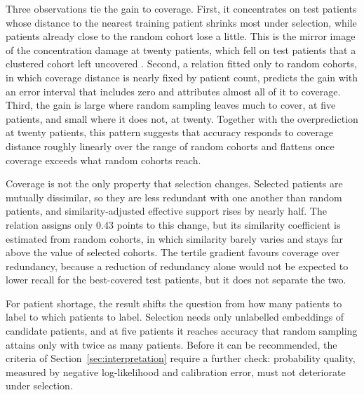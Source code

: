 Three observations tie the gain to coverage. First, it concentrates on test patients whose distance to the nearest training patient shrinks most under selection, while patients already close to the random cohort lose a little. This is the mirror image of the concentration damage at twenty patients, which fell on test patients that a clustered cohort left uncovered \citep{queisler2026cohortComposition}. Second, a relation fitted only to random cohorts, in which coverage distance is nearly fixed by patient count, predicts the gain with an error interval that includes zero and attributes almost all of it to coverage. Third, the gain is large where random sampling leaves much to cover, at five patients, and small where it does not, at twenty. Together with the overprediction at twenty patients, this pattern suggests that accuracy responds to coverage distance roughly linearly over the range of random cohorts and flattens once coverage exceeds what random cohorts reach.

Coverage is not the only property that selection changes. Selected patients are mutually dissimilar, so they are less redundant with one another than random patients, and similarity-adjusted effective support rises by nearly half. The relation assigns only 0.43 points to this change, but its similarity coefficient is estimated from random cohorts, in which similarity barely varies and stays far above the value of selected cohorts. The tertile gradient favours coverage over redundancy, because a reduction of redundancy alone would not be expected to lower recall for the best-covered test patients, but it does not separate the two.

For patient shortage, the result shifts the question from how many patients to label to which patients to label. Selection needs only unlabelled embeddings of candidate patients, and at five patients it reaches accuracy that random sampling attains only with twice as many patients. Before it can be recommended, the criteria of Section~\ref{sec:interpretation} require a further check: probability quality, measured by negative log-likelihood and calibration error, must not deteriorate under selection.
